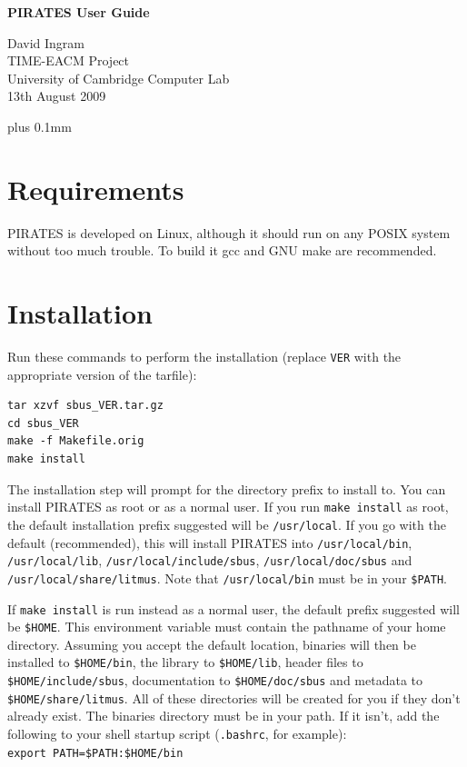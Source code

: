 \documentclass[12pt,a4paper,twoside]{article}
\renewcommand{\_}{\texttt{\symbol{95}}}
\begin{document}
\centerline{\textbf{\LARGE PIRATES User Guide}}
\begin{center} \large
David Ingram\\
TIME-EACM Project\\
University of Cambridge Computer Lab\\
13th August 2009\\
\end{center}

{ \parskip 0.1mm plus 0.1mm \tableofcontents }
\pagestyle{fancy}

\section{Requirements}

PIRATES is developed on Linux, although it should run on any POSIX
system without too much trouble. To build it gcc and GNU make
are recommended.

\section{Installation}

Run these commands to perform the installation (replace \verb^VER^ with
the appropriate version of the tarfile):

\begin{verbatim}
tar xzvf sbus_VER.tar.gz
cd sbus_VER
make -f Makefile.orig
make install
\end{verbatim}

The installation step will prompt for the directory prefix to install
to. You can install PIRATES as root or as a normal user.
If you run \verb^make install^ as root, the default installation prefix
suggested will be \verb^/usr/local^.
If you go with the default (recommended), this will install PIRATES into
\verb^/usr/local/bin^, \verb^/usr/local/lib^, \verb^/usr/local/include/sbus^,
\verb^/usr/local/doc/sbus^ and \verb^/usr/local/share/litmus^.
Note that \verb^/usr/local/bin^ must be in your \verb^$PATH^.

If \verb^make install^ is run instead as a normal user, the default prefix
suggested will be \verb^$HOME^. This environment variable must contain
the pathname of your home directory. Assuming you accept the default
location, binaries will then be installed to
\verb^$HOME/bin^, the library to \verb^$HOME/lib^, header files to
\verb^$HOME/include/sbus^, documentation to \verb^$HOME/doc/sbus^ and
metadata to \verb^$HOME/share/litmus^.
All of these directories will be created for you if they don't
already exist.
The binaries directory must be in your path. If it isn't, add the
following to your shell startup script (\verb^.bashrc^, for example):\\
\verb^export PATH=$PATH:$HOME/bin^
\end{document}
